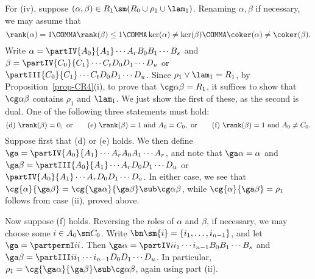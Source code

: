 For (iv), suppose $(\alpha,\beta)\in R_1\sm (R_0 \cup \rho_1 \cup \lam_1 )$.  
Renaming $\alpha,\beta$ if necessary, we may assume that
\[
\rank(\alpha)=1\COMMA
\rank(\beta)\leq1 \COMMA
\ker(\alpha)\not=\ker(\beta)\COMMA
\coker(\alpha)\not=\coker(\beta).
\]
Write $\alpha=\partIV{A_0}{A_1}\cdots{A_r}{B_0}{B_1}\cdots{B_s}$ and $\beta=\partIV{C_0}{C_1}\cdots{C_t}{D_0}{D_1}\cdots{D_u}$ or $\partIII{C_0}{C_1}\cdots{C_t}{D_0}{D_1}\cdots{D_u}$.
Since $\rho_1\vee\lam_1=R_1$, by Proposition~\ref{prop-CR4}(i), to prove that $\cg\alpha\beta=R_1$, it suffices to show that $\cg\alpha\beta$ contains $\rho_1$ and $\lam_1$.  We just show the first of these, as the second is dual.  One of the following three statements must hold: 
\[
\text{(d)}\ \rank(\beta)=0,\ \text{or}\ \ \ \ \ \ 
\text{(e)}\ \rank(\beta)=1\  \text{and}\  A_0=C_0,\ \text{or}\ \ \  \ \ \ 
\text{(f)}\ \rank(\beta)=1\ \text{and}\ A_0\not=C_0.
\]
Suppose first that (d) or (e) holds.  We then define $\ga=\partIV{A_0}{A_1}\cdots{A_r}{A_0}{A_1}\cdots{A_r}$,
and note that $\ga\alpha=\alpha$ and $\ga\beta=\partIII{A_0}{A_1}\cdots{A_r}{D_0}{D_1}\cdots{D_u}$ or $\partIV{A_0}{A_1}\cdots{A_r}{D_0}{D_1}\cdots{D_u}$.
In either case, we see that $\cg{\alpha}{\ga\beta}=\cg{\ga\alpha}{\ga\beta}\sub\cg\alpha\beta$, while ${\cg{\alpha}{\ga\beta}=\rho_1}$ follows from case (ii), proved above.  

Now suppose (f) holds.  Reversing the roles of $\alpha$ and $\beta$, if necessary, we may choose some $i\in A_0\sm C_0$.  Write $\bn\sm\{i\}=\{i_1,\ldots,i_{n-1}\}$, and let $\ga=\partpermI ii$.
Then $\ga\alpha=\partIV i{i_1}\cdots{i_{n-1}}{B_0}{B_1}\cdots{B_s}$ and $\ga\beta=\partIII i{i_1}\cdots{i_{n-1}}{D_0}{D_1}\cdots{D_u}$.
In particular, $\rho_1=\cg{\ga\alpha}{\ga\beta}\sub\cg\alpha\beta$, again using part (ii).  \epf


